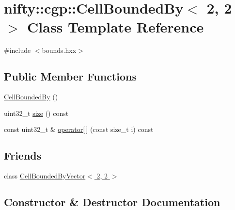 \hypertarget{classnifty_1_1cgp_1_1CellBoundedBy_3_012_00_012_01_4}{}\section{nifty\+:\+:cgp\+:\+:Cell\+Bounded\+By$<$ 2, 2 $>$ Class Template Reference}
\label{classnifty_1_1cgp_1_1CellBoundedBy_3_012_00_012_01_4}


{\ttfamily \#include $<$bounds.\+hxx$>$}

\subsection*{Public Member Functions}
\begin{DoxyCompactItemize}
\item 
\hyperlink{classnifty_1_1cgp_1_1CellBoundedBy_3_012_00_012_01_4_a1a0bbe867a4d5959bd2dba49c9f61b51}{Cell\+Bounded\+By} ()
\item 
uint32\+\_\+t \hyperlink{classnifty_1_1cgp_1_1CellBoundedBy_3_012_00_012_01_4_ab6e16339e9e0729de75c447d19b04228}{size} () const 
\item 
const uint32\+\_\+t \& \hyperlink{classnifty_1_1cgp_1_1CellBoundedBy_3_012_00_012_01_4_aa01c8770393f763d50049a5ed2318338}{operator\mbox{[}$\,$\mbox{]}} (const size\+\_\+t i) const 
\end{DoxyCompactItemize}
\subsection*{Friends}
\begin{DoxyCompactItemize}
\item 
class \hyperlink{classnifty_1_1cgp_1_1CellBoundedBy_3_012_00_012_01_4_ac693d488f7701019d117083cebc4508b}{Cell\+Bounded\+By\+Vector$<$ 2, 2 $>$}
\end{DoxyCompactItemize}


\subsection{Constructor \& Destructor Documentation}
\hypertarget{classnifty_1_1cgp_1_1CellBoundedBy_3_012_00_012_01_4_a1a0bbe867a4d5959bd2dba49c9f61b51}{}
